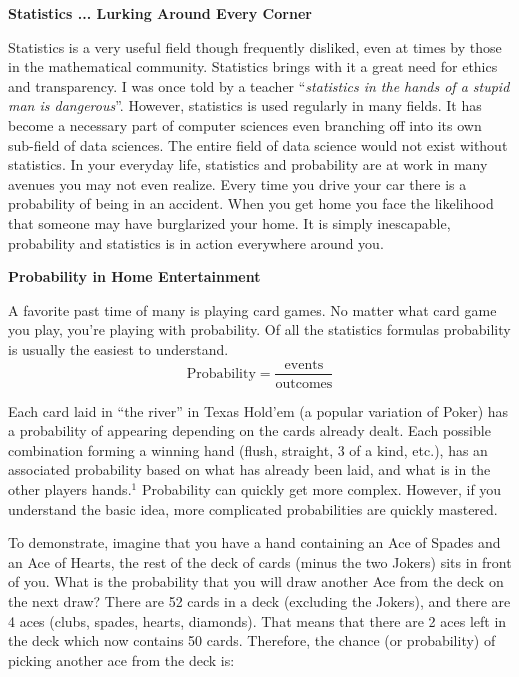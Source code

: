 \documentclass[11pt]{article}
\begin{document}
\begin{center}

\color{RoyalPurple} \textbf{\Large Statistics ... Lurking Around Every Corner}

\end{center}

\color{black}

Statistics is a very useful field though frequently disliked, even at times by those in the mathematical community. Statistics brings with it a great need for ethics and transparency. I was once told by a teacher “\textit{statistics in the hands of a stupid man is dangerous}”. However, statistics is used regularly in many fields. It has become a necessary part of computer sciences even branching off into its own sub-field of data sciences. The entire field of data science would not exist without statistics. In your everyday life, statistics and probability are at work in many avenues you may not even realize. Every time you drive your car there is a probability of being in an accident. When you get home you face the likelihood that someone may have burglarized your home. It is simply inescapable, probability and statistics is in action everywhere around you. 

\bigskip

\bigskip

\noindent \color{RoyalPurple} \textbf{\large Probability in Home Entertainment}

\bigskip

\color{black}

A favorite past time of many is playing card games. No matter what card game you play, you're playing with probability. Of all the statistics formulas probability is usually the easiest to understand.
\color{OliveGreen}
$$ \text{Probability} = \frac{\text{events}}{\text{outcomes}} $$ 

\color{black}
\bigskip
\noindent Each card laid in “the river” in Texas Hold’em (a popular variation of Poker) has a probability of appearing depending on the cards already dealt. Each possible combination forming a winning hand (flush, straight, 3 of a kind, etc.), has an associated probability based on what has already been laid, and what is in the other players hands.$^1$ Probability can quickly get more complex. However, if you understand the basic idea, more complicated probabilities are quickly mastered. 

\bigskip

To demonstrate, imagine that you have a hand containing an Ace of Spades and an Ace of Hearts, the rest of the deck of cards (minus the two Jokers) sits in front of you. What is the probability that you will draw another Ace from the deck on the next draw? There are 52 cards in a deck (excluding the Jokers), and there are 4 aces (clubs, spades, hearts, diamonds). That means that there are 2 aces left in the deck which now contains 50 cards. Therefore, the chance (or probability) of picking another ace from the deck is: 
\end{document}
